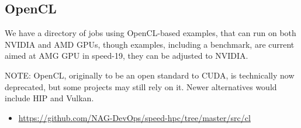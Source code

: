 \subsection{OpenCL}
\label{sect:cl}

We have a directory of jobs using OpenCL-based examples, that can
run on both NVIDIA and AMD GPUs, though examples, including a
benchmark, are current aimed at AMG GPU in speed-19, they can
be adjusted to NVIDIA.

NOTE: OpenCL, originally to be an open standard to CUDA,
is technically now deprecated, but some projects may still
rely on it. Newer alternatives would include HIP and Vulkan.

\begin{itemize}
  \item \url{https://github.com/NAG-DevOps/speed-hpc/tree/master/src/cl}
\end{itemize}


